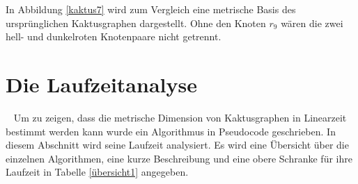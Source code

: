   	 In Abbildung \ref{kaktus7} wird zum Vergleich eine metrische Basis des ursprünglichen Kaktusgraphen dargestellt. Ohne den Knoten $r_9$ wären die zwei hell- und dunkelroten Knotenpaare nicht getrennt.
  	 \clearpage
\section{Die Laufzeitanalyse}
~\linebreak
Um zu zeigen, dass die metrische Dimension von Kaktusgraphen in Linearzeit bestimmt werden kann wurde ein Algorithmus in Pseudocode geschrieben. In diesem Abschnitt wird seine Laufzeit analysiert. Es wird eine Übersicht über die einzelnen Algorithmen, eine kurze Beschreibung und eine obere Schranke für ihre Laufzeit in Tabelle \ref{übersicht1} angegeben.\newline
\vspace{-1mm}
